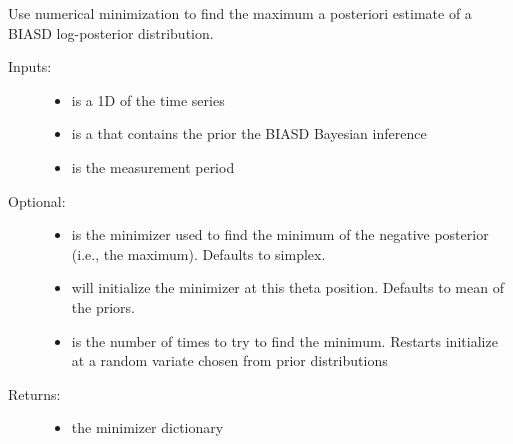 \documentclass[letterpaper,10pt,english]{sphinxmanual}
\begin{document}

\begin{fulllineitems}
\label{code_laplace:laplace.find_map}
Use numerical minimization to find the maximum a posteriori estimate of a BIASD log-posterior distribution.
\begin{description}
\item[{Inputs:}] \leavevmode\begin{itemize}
\item {} 
 is a 1D  of the time series

\item {} 
 is a  that contains the prior the BIASD Bayesian inference

\item {} 
 is the measurement period

\end{itemize}

\item[{Optional:}] \leavevmode\begin{itemize}
\item {} 
 is the minimizer used to find the minimum of the negative posterior (i.e., the maximum). Defaults to simplex.

\item {} 
 will initialize the minimizer at this theta position. Defaults to mean of the priors.

\item {} 
 is the number of times to try to find the minimum. Restarts initialize at a random variate chosen from prior distributions

\end{itemize}

\item[{Returns:}] \leavevmode\begin{itemize}
\item {} 
the minimizer dictionary

\end{itemize}

\end{description}

\end{fulllineitems}
\end{document}
